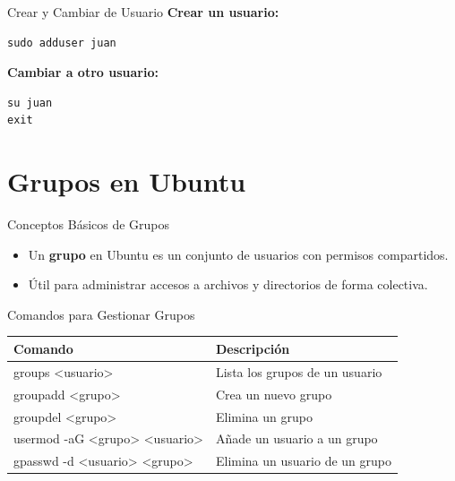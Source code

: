 \documentclass{beamer}
\begin{document}
\begin{frame}{Crear y Cambiar de Usuario}
    \textbf{Crear un usuario:}
    \begin{lstlisting}
sudo adduser juan
    \end{lstlisting}
    \textbf{Cambiar a otro usuario:}
    \begin{lstlisting}
su juan
exit
    \end{lstlisting}
\end{frame}

\section{Grupos en Ubuntu}

\begin{frame}{Conceptos Básicos de Grupos}
    \begin{itemize}
        \item Un \textbf{grupo} en Ubuntu es un conjunto de usuarios con permisos compartidos.
        \item Útil para administrar accesos a archivos y directorios de forma colectiva.
    \end{itemize}
\end{frame}

\begin{frame}{Comandos para Gestionar Grupos}
    \begin{center}
    \begin{tabular}{l l}
    \hline
    \textbf{Comando} & \textbf{Descripción} \\
    \hline
    groups <usuario> & Lista los grupos de un usuario \\
    groupadd <grupo> & Crea un nuevo grupo \\
    groupdel <grupo> & Elimina un grupo \\
    usermod -aG <grupo> <usuario> & Añade un usuario a un grupo \\
    gpasswd -d <usuario> <grupo> & Elimina un usuario de un grupo \\
    \hline
    \end{tabular}
    \end{center}
\end{frame}

\end{document}
